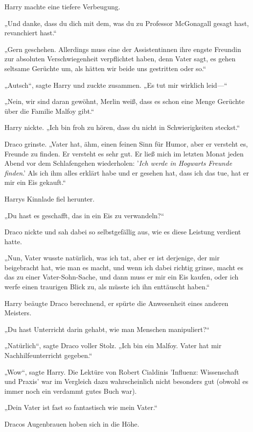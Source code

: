 {Harry machte eine tiefere Verbeugung.

„Und danke, dass du dich mit dem, was du zu Professor McGonagall gesagt hast, revanchiert hast.“

„Gern geschehen. Allerdings muss eine der Assistentinnen ihre engste Freundin zur absoluten Verschwiegenheit verpflichtet haben, denn Vater sagt, es gehen seltsame Gerüchte um, als hätten wir beide uns gestritten oder so.“

„Autsch“, sagte Harry und zuckte zusammen. „Es tut mir wirklich leid—“

„Nein, wir sind daran gewöhnt, Merlin weiß, dass es schon eine Menge Gerüchte über die Familie Malfoy gibt.“

Harry nickte. „Ich bin froh zu hören, dass du nicht in Schwierigkeiten steckst.“

Draco grinste. „Vater hat, ähm, einen feinen Sinn für Humor, aber er versteht es, Freunde zu finden. Er versteht es sehr gut. Er ließ mich im letzten Monat jeden Abend vor dem Schlafengehen wiederholen: '\emph{Ich werde in Hogwarts Freunde finden}.' Als ich ihm alles erklärt habe und er gesehen hat, dass ich das tue, hat er mir ein Eis gekauft.“

Harrys Kinnlade fiel herunter.

„Du hast es geschafft, das in ein Eis zu verwandeln?“

Draco nickte und sah dabei so selbstgefällig aus, wie es diese Leistung verdient hatte.

„Nun, Vater wusste natürlich, was ich tat, aber er ist derjenige, der mir beigebracht hat, wie man es macht, und wenn ich dabei richtig grinse, macht es das zu einer Vater-Sohn-Sache, und dann muss er mir ein Eis kaufen, oder ich werfe einen traurigen Blick zu, als müsste ich ihn enttäuscht haben.“

Harry beäugte Draco berechnend, er spürte die Anwesenheit eines anderen Meisters.

„Du hast Unterricht darin gehabt, wie man Menschen manipuliert?“

„Natürlich“, sagte Draco voller Stolz. „Ich bin ein Malfoy. Vater hat mir Nachhilfeunterricht gegeben.“

„Wow“, sagte Harry. Die Lektüre von Robert Cialdinis 'Influenz: Wissenschaft und Praxis' war im Vergleich dazu wahrscheinlich nicht besonders gut (obwohl es immer noch ein verdammt gutes Buch war).

„Dein Vater ist fast so fantastisch wie mein Vater.“

Dracos Augenbrauen hoben sich in die Höhe.

}
